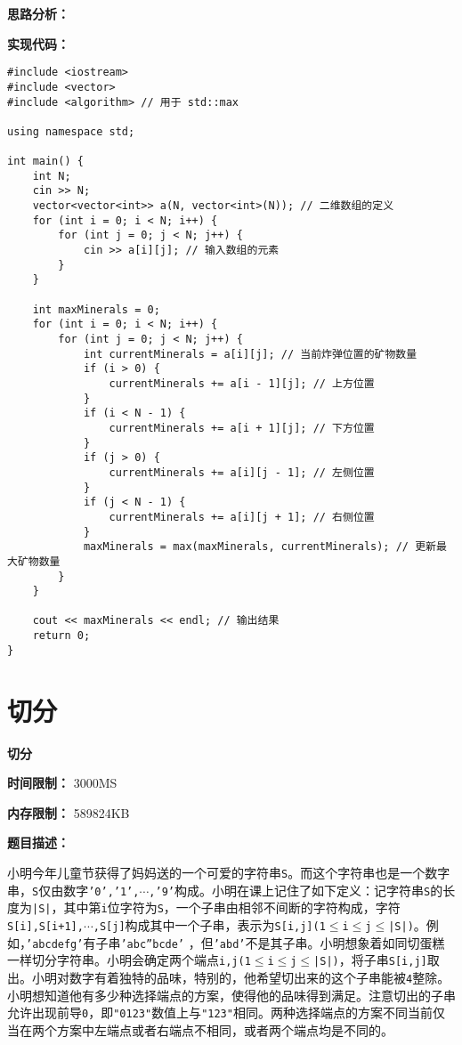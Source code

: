 \documentclass[a4paper]{ctexart}
\begin{document}
\noindent\textbf{思路分析：}
	
	
	
	
\noindent\textbf{实现代码：}

\begin{lstlisting}
#include <iostream>
#include <vector>
#include <algorithm> // 用于 std::max

using namespace std;

int main() {
	int N;
	cin >> N;
	vector<vector<int>> a(N, vector<int>(N)); // 二维数组的定义
	for (int i = 0; i < N; i++) {
		for (int j = 0; j < N; j++) {
			cin >> a[i][j]; // 输入数组的元素
		}
	}
	
	int maxMinerals = 0;
	for (int i = 0; i < N; i++) {
		for (int j = 0; j < N; j++) {
			int currentMinerals = a[i][j]; // 当前炸弹位置的矿物数量
			if (i > 0) {
				currentMinerals += a[i - 1][j]; // 上方位置
			}
			if (i < N - 1) {
				currentMinerals += a[i + 1][j]; // 下方位置
			}
			if (j > 0) {
				currentMinerals += a[i][j - 1]; // 左侧位置
			}
			if (j < N - 1) {
				currentMinerals += a[i][j + 1]; // 右侧位置
			}
			maxMinerals = max(maxMinerals, currentMinerals); // 更新最大矿物数量
		}
	}
	
	cout << maxMinerals << endl; // 输出结果
	return 0;
}

\end{lstlisting}
	
\newpage
	
\section{切分}
	
\begin{center}
	\Large \textbf{切分}
\end{center}
	
\noindent\textbf{时间限制：} 3000MS
	
\noindent\textbf{内存限制：} 589824KB
	
\vspace{10pt}
	
\noindent\textbf{题目描述：}
	
小明今年儿童节获得了妈妈送的一个可爱的字符串\texttt{S}。而这个字符串也是一个数字串，\texttt{S}仅由数字\texttt{'0','1',$\cdots$,'9'}构成。小明在课上记住了如下定义：记字符串\texttt{S}的长度为\texttt{|S|}，其中第\texttt{i}位字符为\texttt{S}，一个子串由相邻不间断的字符构成，字符\texttt{S[i],S[i+1],$\cdots$,S[j]}构成其中一个子串，表示为\texttt{S[i,j](1$\leq$i$\leq$j$\leq$|S|)}。例如，\texttt{'abcdefg'}有子串\texttt{'abc''bcde'} ，但\texttt{'abd'}不是其子串。小明想象着如同切蛋糕一样切分字符串。小明会确定两个端点\texttt{i,j(1$\leq$i$\leq$j$\leq$|S|)}，将子串\texttt{S[i,j]}取出。小明对数字有着独特的品味，特别的，他希望切出来的这个子串能被\texttt{4}整除。小明想知道他有多少种选择端点的方案，使得他的品味得到满足。注意切出的子串允许出现前导\texttt{0}，即\texttt{"0123"}数值上与\texttt{"123"}相同。两种选择端点的方案不同当前仅当在两个方案中左端点或者右端点不相同，或者两个端点均是不同的。
	
\end{document}
